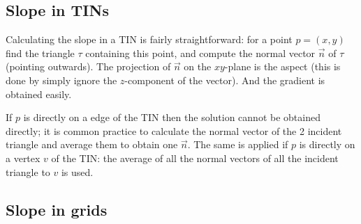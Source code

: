 


\subsection{Slope in TINs}

Calculating the slope in a TIN is fairly straightforward: for a point $p=(x,y)$ find the triangle $\tau$ containing this point, and compute the normal vector $\vec{n}$ of $\tau$ (pointing outwards). 
The projection of $\vec{n}$ on the $xy$-plane is the aspect (this is done by simply ignore the $z$-component of the vector).
And the gradient is obtained easily.

If $p$ is directly on a edge of the TIN then the solution cannot be obtained directly; it is common practice to calculate the normal vector of the 2 incident triangle and average them to obtain one $\vec{n}$.
The same is applied if $p$ is directly on a vertex $v$ of the TIN: the average of all the normal vectors of all the incident triangle to $v$ is used.


\subsection{Slope in grids}

